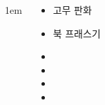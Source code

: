 \documentclass[	20pt, 
							a1paper, 
							portrait, %
							margin=0mm, %
							innermargin=10mm,  		%
							colspace=5mm, 
							subcolspace=0mm
							]{tikzposter}
\begin{document}
\begin{columns}
			{
					\setlength{\leftmargini}{4em}
					\setlength{\labelsep} {1em}
				\begin{LARGE}
					\begin{itemize}
					\item 고무 판화 
					\item 북 프래스기
					\item 
					\item 
					\item 
					\item 
					\end{itemize}
				\end{LARGE}
			}



	\end{columns}
\end{document}
